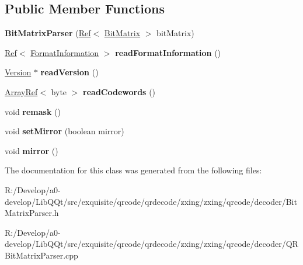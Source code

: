 \subsection*{Public Member Functions}
\begin{DoxyCompactItemize}
\item 
\mbox{\label{classzxing_1_1qrcode_1_1_bit_matrix_parser_ae62cc3c99d04e4e329a988f57a8575fe}} 
{\bfseries Bit\+Matrix\+Parser} (\mbox{\hyperlink{classzxing_1_1_ref}{Ref}}$<$ \mbox{\hyperlink{classzxing_1_1_bit_matrix}{Bit\+Matrix}} $>$ bit\+Matrix)
\item 
\mbox{\label{classzxing_1_1qrcode_1_1_bit_matrix_parser_a5e4f7ae3b16131a52ea5f835a4e6d9f3}} 
\mbox{\hyperlink{classzxing_1_1_ref}{Ref}}$<$ \mbox{\hyperlink{classzxing_1_1qrcode_1_1_format_information}{Format\+Information}} $>$ {\bfseries read\+Format\+Information} ()
\item 
\mbox{\label{classzxing_1_1qrcode_1_1_bit_matrix_parser_a6fea9eb1973532b37d291434a91eead7}} 
\mbox{\hyperlink{classzxing_1_1qrcode_1_1_version}{Version}} $\ast$ {\bfseries read\+Version} ()
\item 
\mbox{\label{classzxing_1_1qrcode_1_1_bit_matrix_parser_a2fc58280a3806eadbc5c80b4faa1fd6d}} 
\mbox{\hyperlink{classzxing_1_1_array_ref}{Array\+Ref}}$<$ byte $>$ {\bfseries read\+Codewords} ()
\item 
\mbox{\label{classzxing_1_1qrcode_1_1_bit_matrix_parser_ac2a6a89d4ae1a0b74efaa4f6a1b13755}} 
void {\bfseries remask} ()
\item 
\mbox{\label{classzxing_1_1qrcode_1_1_bit_matrix_parser_a035460a15042a288128b5ef814ec3cea}} 
void {\bfseries set\+Mirror} (boolean mirror)
\item 
\mbox{\label{classzxing_1_1qrcode_1_1_bit_matrix_parser_a2ec2122d33d6fdbed7f47489f6d475a4}} 
void {\bfseries mirror} ()
\end{DoxyCompactItemize}


The documentation for this class was generated from the following files\+:\begin{DoxyCompactItemize}
\item 
R\+:/\+Develop/a0-\/develop/\+Lib\+Q\+Qt/src/exquisite/qrcode/qrdecode/zxing/zxing/qrcode/decoder/Bit\+Matrix\+Parser.\+h\item 
R\+:/\+Develop/a0-\/develop/\+Lib\+Q\+Qt/src/exquisite/qrcode/qrdecode/zxing/zxing/qrcode/decoder/Q\+R\+Bit\+Matrix\+Parser.\+cpp\end{DoxyCompactItemize}
